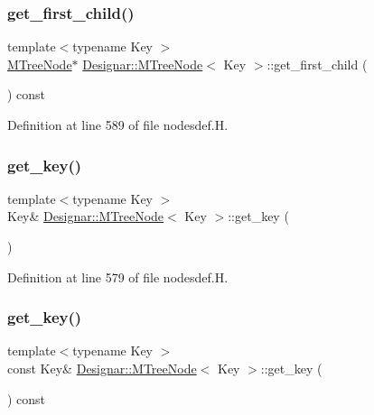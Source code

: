\subsubsection{\texorpdfstring{get\+\_\+first\+\_\+child()}{get\_first\_child()}}
{\footnotesize\ttfamily template$<$typename Key $>$ \\
\hyperlink{class_designar_1_1_m_tree_node}{M\+Tree\+Node}$\ast$ \hyperlink{class_designar_1_1_m_tree_node}{Designar\+::\+M\+Tree\+Node}$<$ Key $>$\+::get\+\_\+first\+\_\+child (\begin{DoxyParamCaption}{ }\end{DoxyParamCaption}) const\hspace{0.3cm}{\ttfamily [inline]}}



Definition at line 589 of file nodesdef.\+H.

\mbox{\label{class_designar_1_1_m_tree_node_a6bccdf14efbc480aaa4d23c943b5a100}} 
\subsubsection{\texorpdfstring{get\+\_\+key()}{get\_key()}\hspace{0.1cm}{\footnotesize\ttfamily [1/2]}}
{\footnotesize\ttfamily template$<$typename Key $>$ \\
Key\& \hyperlink{class_designar_1_1_m_tree_node}{Designar\+::\+M\+Tree\+Node}$<$ Key $>$\+::get\+\_\+key (\begin{DoxyParamCaption}{ }\end{DoxyParamCaption})\hspace{0.3cm}{\ttfamily [inline]}}



Definition at line 579 of file nodesdef.\+H.

\mbox{\label{class_designar_1_1_m_tree_node_aaf4dc39561e8db6973db9c1b5a88b466}} 
\subsubsection{\texorpdfstring{get\+\_\+key()}{get\_key()}\hspace{0.1cm}{\footnotesize\ttfamily [2/2]}}
{\footnotesize\ttfamily template$<$typename Key $>$ \\
const Key\& \hyperlink{class_designar_1_1_m_tree_node}{Designar\+::\+M\+Tree\+Node}$<$ Key $>$\+::get\+\_\+key (\begin{DoxyParamCaption}{ }\end{DoxyParamCaption}) const\hspace{0.3cm}{\ttfamily [inline]}}



